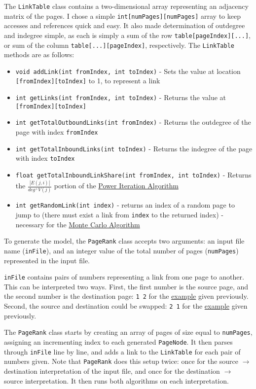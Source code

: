 \documentclass[11pt]{article}
\begin{document}
The \verb!LinkTable! class contains a two-dimensional array representing an adjacency matrix of the pages. I chose a simple \verb!int[numPages][numPages]! array to keep accesses and references quick and easy. It also made determination of outdegree and indegree simple, as each is simply a sum of the row \verb!table[pageIndex][...]!, or sum of the column \verb!table[...][pageIndex]!, respectively.
The \verb!LinkTable! methods are as follows:
\begin{itemize}
\item \verb!void addLink(int fromIndex, int toIndex)! - Sets the value at location \verb![fromIndex][toIndex]! to 1, to represent a link
\item \verb!int getLinks(int fromIndex, int toIndex)! - Returns the value at \verb![fromIndex][toIndex]!
\item \verb!int getTotalOutboundLinks(int fromIndex)! - Returns the outdegree of the page with index \verb!fromIndex!
\item \verb!int getTotalInboundLinks(int toIndex)! - Returns the indegree of the page with index \verb!toIndex!
\item \verb!float getTotalInboundLinkShare(int fromIndex, int toIndex)! - Returns the \hyperref[eq:poweriter]{$\frac{|E(j,i)|}{deg^+V(j)}$} portion of the \hyperref[sec:power]{Power Iteration Algorithm}
\item \verb!int getRandomLink(int index)! - returns an index of a random page to jump to (there must exist a link from \verb!index! to the returned index) - necessary for the \hyperref[sec:monte]{Monte Carlo Algorithm}
\end{itemize}

To generate the model, the \verb!PageRank! class accepts two arguments: an input file name (\verb!inFile!), and an integer value of the total number of pages (\verb!numPages!) represented in the input file.

\verb!inFile! contains pairs of numbers representing a link from one page to another. This can be interpreted two ways. 
First, the first number is the source page, and the second number is the destination page: \verb!1 2! for the \hyperref[fig:webgraph]{example} given previously.
Second, the source and destination could be swapped: \verb!2 1! for the \hyperref[fig:webgraph]{example} given previously.

The \verb!PageRank! class starts by creating an array of pages of size equal to \verb!numPages!, assigning an incrementing index to each generated \verb!PageNode!. It then parses through \verb!inFile! line by line, and adds a link to the \verb!LinkTable! for each pair of numbers given. Note that \verb!PageRank! does this setup twice: once for the source $\to$ destination interpretation of the input file, and once for the destination $\to$ source interpretation. It then runs both algorithms on each interpretation.
\end{document}
